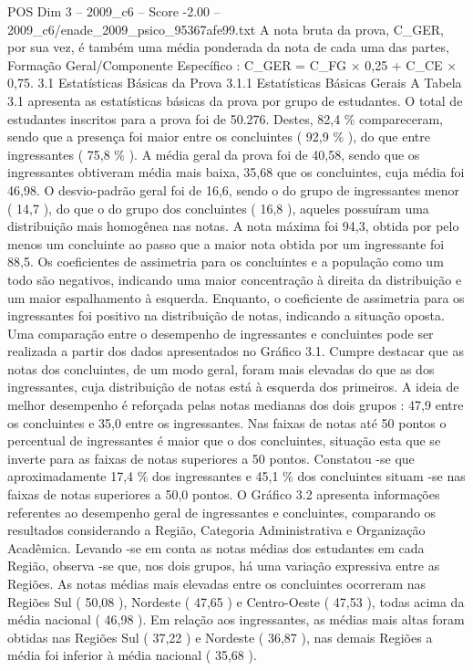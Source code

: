 \begin{textsample}{POS Dim 3 – 2009\_c6 – Score -2.00 – 2009\_c6/enade\_2009\_psico\_95367afe99.txt}
A nota bruta da prova, C\_GER, por sua vez, é também uma média ponderada da nota de cada uma das partes, Formação Geral/Componente Específico : C\_GER = C\_FG × 0,25 + C\_CE × 0,75. 3.1 Estatísticas Básicas da Prova 3.1.1 Estatísticas Básicas Gerais A Tabela 3.1 apresenta as estatísticas básicas da prova por grupo de estudantes.
O total de estudantes inscritos para a prova foi de 50.276.
Destes, 82,4 \% compareceram, sendo que a presença foi maior entre os concluintes ( 92,9 \% ), do que entre ingressantes ( 75,8 \% ).
A média geral da prova foi de 40,58, sendo que os ingressantes obtiveram média mais baixa, 35,68 que os concluintes, cuja média foi 46,98.
O desvio-padrão geral foi de 16,6, sendo o do grupo de ingressantes menor ( 14,7 ), do que o do grupo dos concluintes ( 16,8 ), aqueles possuíram uma distribuição mais homogênea nas notas.
A nota máxima foi 94,3, obtida por pelo menos um concluinte ao passo que a maior nota obtida por um ingressante foi 88,5.
Os coeficientes de assimetria para os concluintes e a população como um todo são negativos, indicando uma maior concentração à direita da distribuição e um maior espalhamento à esquerda.
Enquanto, o coeficiente de assimetria para os ingressantes foi positivo na distribuição de notas, indicando a situação oposta.
Uma comparação entre o desempenho de ingressantes e concluintes pode ser realizada a partir dos dados apresentados no Gráfico 3.1.
Cumpre destacar que as notas dos concluintes, de um modo geral, foram mais elevadas do que as dos ingressantes, cuja distribuição de notas está à esquerda dos primeiros.
A ideia de melhor desempenho é reforçada pelas notas medianas dos dois grupos : 47,9 entre os concluintes e 35,0 entre os ingressantes.
Nas faixas de notas até 50 pontos o percentual de ingressantes é maior que o dos concluintes, situação esta que se inverte para as faixas de notas superiores a 50 pontos.
Constatou -se que aproximadamente 17,4 \% dos ingressantes e 45,1 \% dos concluintes situam -se nas faixas de notas superiores a 50,0 pontos.
O Gráfico 3.2 apresenta informações referentes ao desempenho geral de ingressantes e concluintes, comparando os resultados considerando a Região, Categoria Administrativa e Organização Acadêmica.
Levando -se em conta as notas médias dos estudantes em cada Região, observa -se que, nos dois grupos, há uma variação expressiva entre as Regiões.
As notas médias mais elevadas entre os concluintes ocorreram nas Regiões Sul ( 50,08 ), Nordeste ( 47,65 ) e Centro-Oeste ( 47,53 ), todas acima da média nacional ( 46,98 ).
Em relação aos ingressantes, as médias mais altas foram obtidas nas Regiões Sul ( 37,22 ) e Nordeste ( 36,87 ), nas demais Regiões a média foi inferior à média nacional ( 35,68 ).

\end{textsample}
